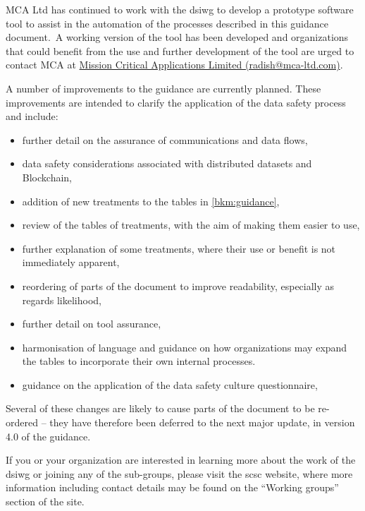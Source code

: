 MCA Ltd has continued to work with the \gls{dsiwg} to develop a prototype software tool to assist in the automation of the processes described in this guidance document.\cbend\
A working version of the tool has been developed and organizations that could benefit from the use and further development of the tool are urged to contact MCA at \href{mailto:radish@mca-ltd.com}{Mission Critical Applications Limited (radish@mca-ltd.com)}.

A number of improvements to the guidance are currently planned.
These improvements are intended to clarify the application of the data safety process
and include:
\begin{itemize}
\item further detail on the assurance of communications and data flows,
\item data safety considerations associated with distributed \glspl{dataset} and Blockchain,
\item addition of new \glspl{treatment} to the tables in \autoref{bkm:guidance},
\item review of the tables of \glspl{treatment}, with the aim of making them easier to use,
\item further explanation of some \glspl{treatment}, where their use or benefit is not immediately apparent, 
\item reordering of parts of the document to improve readability, especially as regards likelihood, 
\item further detail on tool assurance,
\item harmonisation of language and guidance on how organizations may expand the tables to incorporate their own internal processes.
\item guidance on the application of the data safety culture questionnaire,
\end{itemize}
Several of these changes are likely to
cause parts of the document to be re-ordered -- they have therefore been deferred to the next major update, in version 4.0 of the guidance.

If you or your organization are interested in learning more about the work of the \gls{dsiwg} or joining any of the sub-groups,
please visit the \gls{scsc} website, where more information including contact details may be found on the ``Working groups'' section of the site.
%
%
%
